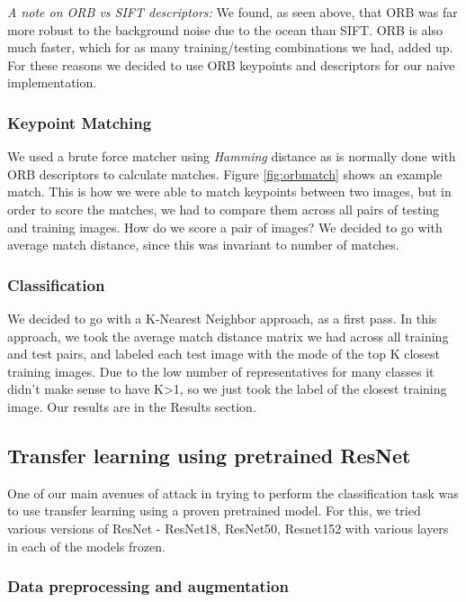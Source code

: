 \textit{A note on ORB vs SIFT descriptors:} We found, as seen above, that ORB was far more robust to the background noise due to the ocean than SIFT. ORB is also much faster, which for as many training/testing combinations we had, added up. For these reasons we decided to use ORB keypoints and descriptors for our naive implementation. 

\subsubsection{Keypoint Matching}

We used a brute force matcher using \textit{Hamming} distance as is normally done with ORB descriptors to calculate matches. Figure \ref{fig:orbmatch} shows an example match. This is how we were able to match keypoints between two images, but in order to score the matches, we had to compare them across all pairs of testing and training images. How do we score a pair of images? We decided to go with average match distance, since this was invariant to number of matches.

\subsubsection{Classification}

We decided to go with a K-Nearest Neighbor approach, as a first pass. In this approach, we took the average match distance matrix we had across all training and test pairs, and labeled each test image with the mode of the top K closest training images. Due to the low number of representatives for many classes it didn't make sense to have K>1, so we just took the label of the closest training image. Our results are in the Results section.

\subsection{Transfer learning using pretrained ResNet}

One of our main avenues of attack in trying to perform the classification task was to use transfer learning using a proven pretrained model. For this, we tried various versions of ResNet - ResNet18, ResNet50, Resnet152 with various layers in each of the models frozen.

\subsubsection{Data preprocessing and augmentation}

